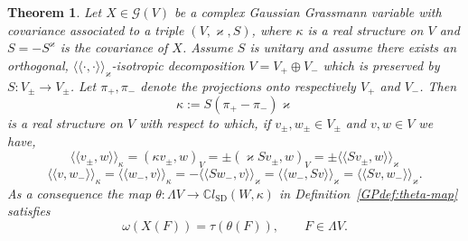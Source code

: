 \documentclass{article}
\newcommand{\assign}{:=}
\newcommand{\cdummy}{\cdot}
\newcommand{\llangle}{{\langle\!\langle}}
\newcommand{\rrangle}{{\rangle\!\rangle}}
\newcommand{\tmop}[1]{\ensuremath{\operatorname{#1}}}
\newtheorem{theorem}{Theorem}
\begin{document}
\begin{theorem}
  \label{GPth:relation}Let $X \in \mathcal{G} (V)$ be a complex Gaussian
  Grassmann variable with covariance associated to a triple $(V, \varkappa,
  S)$, where $\kappa$ is a real structure on $V$ and $S = - S^{\varkappa}$ is
  the covariance of $X$. Assume $S$ is unitary and assume there exists an
  orthogonal, $\llangle \cdummy, \cdummy \rrangle_{\varkappa}$-isotropic
  decomposition $V = V_+ \oplus V_-$ which is preserved by $S : V_{\pm}
  \rightarrow V_{\pm}$. Let $\pi_+, \pi_-$ denote the projections onto
  respectively $V_+$ and $V_-$. Then
  \[ \kappa \assign S (\pi_+ - \pi_-) \varkappa \]
  is a real structure on $V$ with respect to which, if $v_{\pm}, w_{\pm} \in
  V_{\pm}$ and $v, w \in V$ we have,
  \begin{equation}
    \llangle v_{\pm}, w \rrangle_{\kappa} = (\kappa v_{\pm}, w)_V = \pm
    (\varkappa S v_{\pm}, w)_V = \pm \llangle S v_{\pm}, w
    \rrangle_{\varkappa} \label{eq:cov-pm}
  \end{equation}
  \begin{equation}
    \llangle v, w_- \rrangle_{\kappa} = \llangle w_-, v \rrangle_{\kappa} = -
    \llangle S w_-, v \rrangle_{\varkappa} = \llangle w_-, S v
    \rrangle_{\varkappa} = \llangle S v, w_- \rrangle_{\varkappa} .
    \label{eq:cov-pm-2}
  \end{equation}
  As a consequence the map $\theta : \Lambda V \rightarrow
  \mathbb{C}l_{\tmop{SD}} (W, \kappa)$ in Definition~\ref{GPdef:theta-map}
  satisfies
  \begin{equation}
    \omega (X (F)) = \tau (\theta (F)), \qquad F \in \Lambda V.
    \label{eq:relation-OS-GP}
  \end{equation}
\end{theorem}
\end{document}
